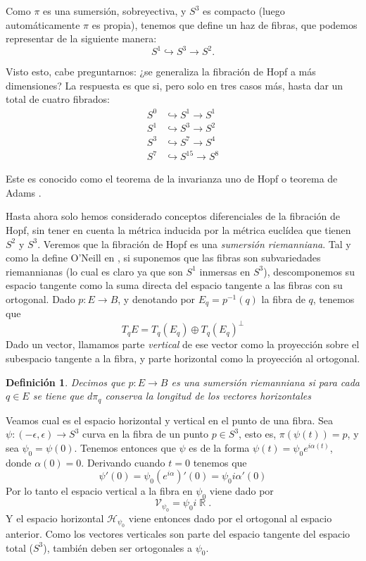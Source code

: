 \documentclass[11pt]{diazessay} %
\newtheorem{definition}{Definición}
\DeclareMathOperator{\R}{\mathbb{R}}
\begin{document}
Como $\pi$ es una sumersión, sobreyectiva, y $S^3$ es compacto (luego automáticamente $\pi$ es propia), tenemos que define un haz de fibras, que podemos representar de la siguiente manera:
\[S^1\hookrightarrow S^3\to S^2.\]

Visto esto, cabe preguntarnos: ¿se generaliza la fibración de Hopf a más dimensiones? La respuesta es que si, pero solo en tres casos más, hasta dar un total de cuatro fibrados:
\begin{align*}
    S^0 & \hookrightarrow S^1 \to S^1    \\
    S^1 & \hookrightarrow S^3 \to S^2    \\
    S^3 & \hookrightarrow S^7 \to S^4    \\
    S^7 & \hookrightarrow S^{15} \to S^8
\end{align*}

Este es conocido como el teorema de la invarianza uno de Hopf o teorema de Adams \cite{adams}.

Hasta ahora solo hemos considerado conceptos diferenciales de la fibración de Hopf, sin tener en cuenta la métrica inducida por la métrica euclídea que tienen $S^2$ y $S^3$. Veremos que la fibración de Hopf es una \textit{sumersión riemanniana}. Tal y como la define O'Neill en \cite{oneill_1966}, si suponemos que las fibras son subvariedades riemannianas (lo cual es claro ya que son $S^1$ inmersas en $S^3$), descomponemos su espacio tangente como la suma directa del espacio tangente a las fibras con su ortogonal. Dado $p:E\to B$, y denotando por $E_q=p^{-1}(q)$ la fibra de $q$, tenemos que
\[T_qE = T_q(E_q)\oplus T_q(E_q)^\bot\]
Dado un vector, llamamos parte \textit{vertical} de ese vector como la proyección sobre el subespacio tangente a la fibra, y parte horizontal como la proyección al ortogonal.

\begin{definition}
    Decimos que $p:E\to B$ es una sumersión riemanniana si para cada $q\in E$ se tiene que $d\pi_q$ conserva la longitud de los vectores horizontales
\end{definition}

Veamos cual es el espacio horizontal y vertical en el punto de una fibra. Sea $\psi:(-\epsilon,\epsilon)\to S^3$ curva en la fibra de un punto $p\in S^3$, esto es, $\pi(\psi(t))=p$, y sea $\psi_0=\psi(0)$. Tenemos entonces que $\psi$ es de la forma $\psi(t)=\psi_0e^{i\alpha(t)}$, donde $\alpha(0)=0$. Derivando cuando $t=0$ tenemos que
\[\psi'(0)=\psi_0(e^{i\alpha})'(0)=\psi_0 i\alpha'(0)\]
Por lo tanto el espacio vertical a la fibra en $\psi_0$ viene dado por
\[\mathcal{V}_{\psi_0}=\psi_0i\R.\]
Y el espacio horizontal $\mathcal{H}_{\psi_0}$ viene entonces dado por el ortogonal al espacio anterior. Como los vectores verticales son parte del espacio tangente del espacio total ($S^3$), también deben ser ortogonales a $\psi_0$.
\end{document}
